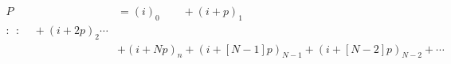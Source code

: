 \documentclass[preview]{standalone}
\begin{document}
\begin{align*}
P &= (i)_0\:\:\:\:\:\:\:\:\:+(i+p)_1\\:\:\::\:\:\:\:\:+(i+2p)_2\cdots\\&+(i+Np)_n+(i+[N-1]p)_{N-1}+(i+[N-2]p)_{N-2}+\cdots
\end{align*}
\end{document}
